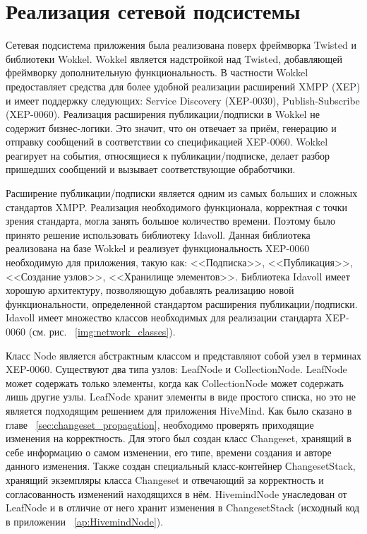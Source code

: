 \section{Реализация сетевой подсистемы}
Сетевая подсистема приложения была реализована поверх фреймворка Twisted и
библиотеки Wokkel. Wokkel является надстройкой над Twisted, добавляющей
фреймворку дополнительную функциональность. В частности Wokkel предоставляет
средства для более удобной реализации расширений XMPP (XEP) и имеет поддержку
следующих: Service Discovery (XEP-0030), Publish-Subscribe (XEP-0060).
Реализация расширения публикации/подписки в Wokkel не содержит бизнес-логики.
Это значит, что он отвечает за приём, генерацию и отправку сообщений в
соответствии со спецификацией XEP-0060. Wokkel реагирует на события, относящиеся
к публикации/подписке, делает разбор пришедших сообщений и вызывает
соответствующие обработчики.

Расширение публикации/подписки является одним из самых больших и сложных
стандартов XMPP. Реализация необходимого функционала, корректная с точки зрения
стандарта, могла занять большое количество времени. Поэтому было принято решение
использовать библиотеку Idavoll. Данная библиотека реализована на базе Wokkel и
реализует функциональность XEP-0060 необходимую для приложения, такую как:
<<Подписка>>, <<Публикация>>, <<Создание узлов>>, <<Хранилище элементов>>.
Библиотека Idavoll имеет хорошую архитектуру, позволяющую добавлять реализацию
новой функциональности, определенной стандартом расширения публикации/подписки.
Idavoll имеет множество классов необходимых для реализации стандарта XEP-0060
(см. рис. ~\ref{img:network_classes}).

Класс Node является абстрактным классом и представляют собой узел в терминах
XEP-0060. Существуют два типа узлов: LeafNode и CollectionNode. LeafNode может
содержать только элементы, когда как CollectionNode может содержать лишь другие
узлы. LeafNode хранит элементы в виде простого списка, но это не является
подходящим решением для приложения HiveMind. Как было сказано в главе
~\ref{sec:changeset_propagation}, необходимо проверять приходящие изменения на
корректность. Для этого был создан класс Changeset, хранящий в себе информацию о
самом изменении, его типе, времени создания и авторе данного изменения. Также
создан специальный класс-контейнер СhangesetStack, хранящий экземпляры класса
Changeset и отвечающий за корректность и согласованность изменений находящихся в
нём. HivemindNode унаследован от LeafNode и в отличие от него хранит изменения в
ChangesetStack (исходный код в приложении ~\ref{ap:HivemindNode}).

